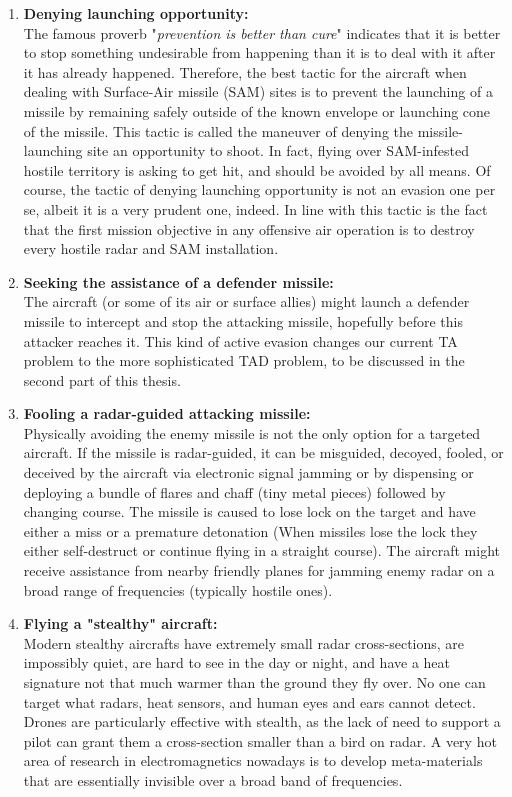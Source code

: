 \begin{enumerate}
	\item \textbf{Denying launching opportunity:}\\
	The famous proverb "\textit{prevention is better than cure}" indicates that it is better to stop something undesirable from happening than it is to deal with it after it has already happened. Therefore, the best tactic for the aircraft when dealing with Surface-Air missile (SAM) sites is to prevent the launching of a missile by remaining safely outside of the known envelope or launching cone of the missile. This tactic is called the maneuver of denying the missile-launching site an opportunity to shoot. In fact, flying over SAM-infested hostile territory is asking to get hit, and should be avoided by all means. Of course, the tactic of denying launching opportunity is not an evasion one per se, albeit it is a very prudent one, indeed. In line with this tactic is the fact that the first mission objective in any offensive air operation is to destroy every hostile radar and SAM installation.
	
	\item \textbf{Seeking the assistance of a defender missile:}\\
	The aircraft (or some of its air or surface allies) might launch a defender missile to intercept and stop the attacking missile, hopefully before this attacker reaches it. This kind of active evasion changes our current TA problem to the more sophisticated TAD problem, to be discussed in the second part of this thesis.
	
	\item \textbf{Fooling a radar-guided attacking missile:}\\
	Physically avoiding the enemy missile is not the only option for a targeted aircraft. If the missile is radar-guided, it can be misguided, decoyed, fooled, or deceived by the aircraft via electronic signal jamming or by dispensing or deploying a bundle of flares and chaff (tiny metal pieces) followed by changing course. The missile is caused to lose lock on the target and have either a miss or a premature detonation (When missiles lose the lock they either self-destruct or continue flying in a straight course). The aircraft might receive assistance from nearby friendly planes for jamming enemy radar on a broad range of frequencies (typically hostile ones).
	
	\item \textbf{Flying a "stealthy" aircraft:}\\
	Modern stealthy aircrafts have extremely small radar cross-sections, are impossibly quiet, are hard to see in the day or night, and have a heat signature not that much warmer than the ground they fly over. No one can target what radars, heat sensors, and human eyes and ears cannot detect. Drones are particularly effective with stealth, as the lack of need to support a pilot can grant them a cross-section smaller than a bird on radar. A very hot area of research in electromagnetics nowadays is to develop meta-materials that are essentially invisible over a broad band of frequencies. 
	
\end{enumerate}


